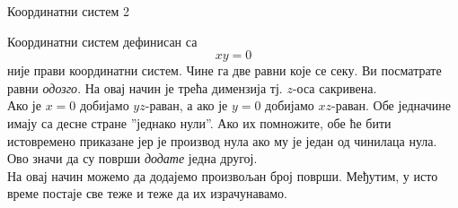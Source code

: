\documentclass[sr]{./../../common/SurferDesc}%
\begin{document}
\footnotesize
%

\begin{surferPage}
  \begin{surferTitle}Координатни систем 2\end{surferTitle}
   \begin{surferText}
   
Координатни систем дефинисан са  
\[xy=0\]
није прави координатни систем. Чине га две равни које се секу. Ви посматрате равни {\it одозго}. На овај начин је трећа димензија тј. $z$-оса сакривена. \\
\vspace{0.3cm}
Ако је $x=0$ добијамо $yz$-раван, а ако је $y=0$ добијамо $xz$-раван.
Обе једначине имају са десне стране ''једнако нули''. Ако их помножите, обе ће бити истовремено приказане јер је производ нула ако му је један од чинилаца нула. Ово значи да су површи  {\it додате} једна другој. \\
На овај начин можемо да додајемо произвољан број површи. Међутим, у исто време постаје све теже и теже да их израчунавамо.
\end{surferText}
\end{surferPage}
\end{document}
